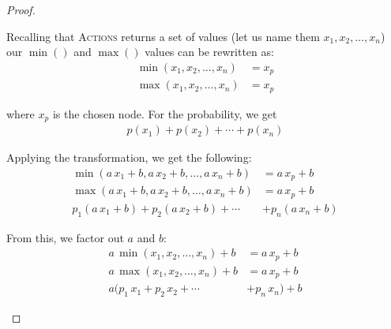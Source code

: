 \documentclass[12pt]{scrartcl}
\begin{document}
\begin{proof}
\begin{description}
            \begin{center}
            \end{center}

            Recalling that \textsc{Actions} returns a set of values (let us name them $x_1, x_2, \ldots, x_n$) our $\min\left(\right)$ and $\max\left(\right)$ values can be rewritten as:
            \begin{align*}
                \min\left( x_1, x_2, \ldots, x_n \right) &= x_p \\
                \max\left( x_1, x_2, \ldots, x_n \right) &= x_p
            \end{align*}

            where $x_p$ is the chosen node. For the probability, we get
            \begin{align*}
                p\left(x_1\right) + p\left(x_2\right) + \cdots + p\left(x_n\right)
            \end{align*}

            Applying the transformation, we get the following:
            \begin{align*}
                \min\left( a\,x_1 + b, a\,x_2 + b, \ldots, a\,x_n + b\right) &= a\,x_p + b \\
                \max\left( a\,x_1 + b, a\,x_2 + b, \ldots, a\,x_n + b\right) &= a\,x_p + b \\
                p_1\left(a\,x_1 + b\right) + p_2\left(a\,x_2 + b\right) + \cdots &+ p_n\left(a\,x_n + b\right)
            \end{align*}

            From this, we factor out $a$ and $b$:
            \begin{align*}
                a\,\min\left( x_1, x_2, \ldots, x_n \right) + b &= a\,x_p + b \\
                a\,\max\left( x_1, x_2, \ldots, x_n \right) + b &= a\,x_p + b \\
                a(p_1\,x_1 + p_2\,x_2 + \cdots &+ p_n\,x_n) + b
            \end{align*}


\end{description}
\end{proof}
\end{document}
